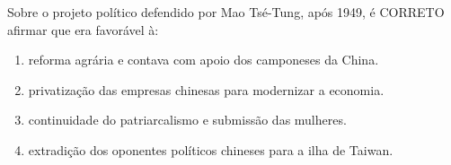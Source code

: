 \par

Sobre o projeto político defendido por Mao Tsé-Tung, após 1949, é CORRETO afirmar que era favorável à:

\begin{enumerate}
\item reforma agrária e contava com apoio dos camponeses da China.
\item privatização das empresas chinesas para modernizar a economia.
\item continuidade do patriarcalismo e submissão das mulheres.
\item extradição dos oponentes políticos chineses para a ilha de Taiwan.\end{enumerate}
